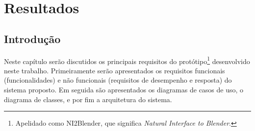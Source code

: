 
\chapter{Resultados}
\label{cap:resultados}

\section{Introdução}
Neste capítulo serão discutidos os principais requisitos do protótipo\footnote{Apelidado como NI2Blender, que significa \textit{Natural Interface to Blender}.} desenvolvido neste trabalho. Primeiramente serão apresentados os requisitos funcionais (funcionalidades) e não funcionais (requisitos de desempenho e resposta) do sistema proposto. Em seguida são apresentados os diagramas de casos de uso, o diagrama de classes, e por fim a arquitetura do sistema.
